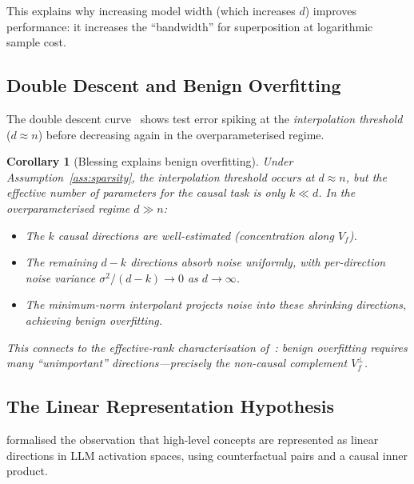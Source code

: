 \documentclass[11pt,a4paper]{article}
\theoremstyle{plain}
\newtheorem{corollary}[theorem]{Corollary}
\theoremstyle{definition}
\theoremstyle{remark}
\begin{document}
This explains why increasing model width (which increases $d$) improves
performance: it increases the ``bandwidth'' for superposition at logarithmic
sample cost.

\subsection{Double Descent and Benign Overfitting}\label{sec:double-descent}

The double descent curve~\citep{belkin2019reconciling} shows test error spiking
at the \emph{interpolation threshold} ($d \approx n$) before decreasing again
in the overparameterised regime.

\begin{corollary}[Blessing explains benign overfitting]%
\label{cor:benign}
Under Assumption~\ref{ass:sparsity}, the interpolation threshold occurs at
$d \approx n$, but the effective number of parameters for the causal task is
only $k \ll d$.  In the overparameterised regime $d \gg n$:
\begin{itemize}[leftmargin=2em]
  \item The $k$ causal directions are well-estimated (concentration along $V_f$).
  \item The remaining $d-k$ directions absorb noise uniformly, with per-direction
    noise variance $\sigma^2/(d-k) \to 0$ as $d \to \infty$.
  \item The minimum-norm interpolant projects noise into these shrinking
    directions, achieving benign overfitting.
\end{itemize}
This connects to the effective-rank characterisation
of~\citet{bartlett2020benign}: benign overfitting requires many ``unimportant''
directions---precisely the non-causal complement $V_f^\perp$.
\end{corollary}

\subsection{The Linear Representation Hypothesis}\label{sec:lrh}

\citet{park2024linear} formalised the observation that high-level concepts are
represented as linear directions in LLM activation spaces, using counterfactual
pairs and a causal inner product.
\end{document}
